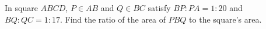In square $ ABCD $, $ P\in AB $ and $ Q\in BC $ satisfy $ BP:PA=1:20 $ and $ BQ:QC=1:17 $. Find the ratio of the area of $ PBQ $ to the square's area.
